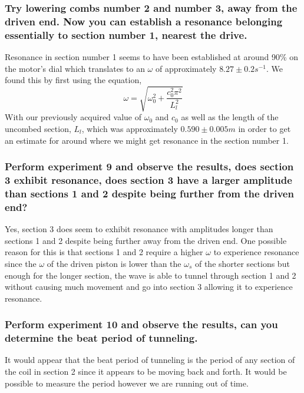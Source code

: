 \documentclass{article}
\begin{document}
\subsubsection*{Try lowering combs number 2 and number 3, away from the driven 
end.  Now you can establish a resonance belonging essentially to section number 1, 
nearest the drive.}
Resonance in section number 1 seems to have been established at around 90\% on 
the motor's dial which translates to an $\omega$ of approximately 
$8.27\pm0.2s^{-1}$.  We found this by first using the equation, 
\[\omega=\sqrt{\omega_{0}^2+\frac{c_{0}^2\pi^2}{L_l^2}}\]
With our previously acquired value of $\omega_{0}$ and $c_{0}$ as well as the
length of the uncombed section, $L_l$, which was approximately $0.590\pm0.005m$
in order to get an estimate for around where we might get resonance in the 
section number 1.
\newpage
\subsubsection*{Perform experiment 9 and observe the results, does section 3
exhibit resonance, does section 3 have a larger amplitude than sections 1 and 2
despite being further from the driven end?}
Yes, section 3 does seem to exhibit resonance with amplitudes longer than
sections 1 and 2 despite being further away from the driven end. One possible
reason for this is that sections 1 and 2 require a higher $\omega$ to experience
resonance since the $\omega$ of the driven piston is lower than the $\omega_s$
of the shorter sections but enough for the longer section, the wave is able to
tunnel through section 1 and 2 without causing much movement and go into section
3 allowing it to experience resonance.

\subsubsection*{Perform experiment 10 and observe the results, can you determine
the beat period of tunneling.}
It would appear that the beat period of tunneling is the period of any section
of the coil in section 2 since it appears to be moving back and forth. It would
be possible to measure the period however we are running out of time.
\end{document}
